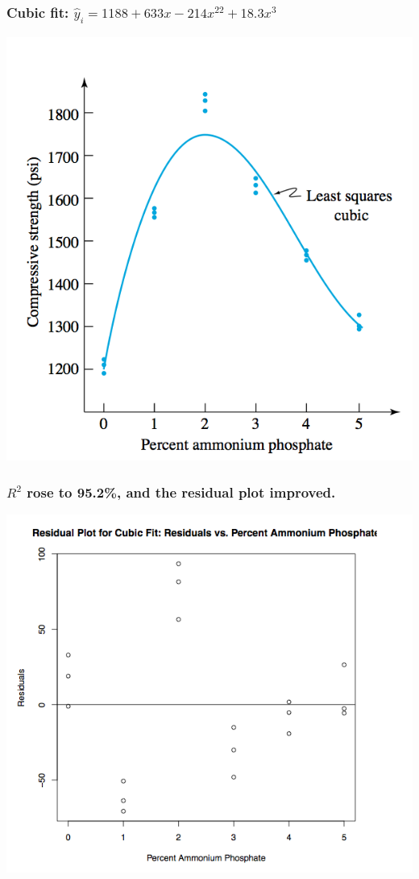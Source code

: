 \documentclass[handout]{beamer}\usepackage{graphicx, color}
\providecommand{\wh}[1]{\widehat{#1}}
\numberwithin{equation}{section}
\begin{document}
\begin{frame}
\frametitle{Cubic fit: $\wh{y}_i = 1188 + 633 x - 214 x^22 + 18.3 x^3$}
 \includegraphics{../../fig/flyashcubicfitfit.png}
\end{frame}

\begin{frame}
\frametitle{$R^2$ rose to 95.2\%, and the residual plot improved.}
 \includegraphics{../../fig/flyashcubicfitres.png}
\end{frame}
\end{document}
